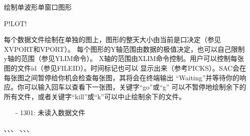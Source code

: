\label{cmd:plot}

绘制单波形单窗口图形

\begin{SACSTX}
P!LOT!
\end{SACSTX}

每个数据文件绘制在单独的图上，图形的整天大小由当前是口决定（参见XVPORT和VPORT）。
每个图形的Y轴范围由数据的极值决定，也可以自己限制y轴的范围（参见YLIM命令）。
X轴的范围由XLIM命令控制。用户可以控制每张图的文件id（参见FILEID）。时间标记也可以
显示出来（参考PICKS）。SAC会在每张图之间暂停给你机会检查每张图，其将会在终端输出
``Waiting''并等待你的响应。你可以输入回车以查看下一张图，关键字``go''或``g''
可以不暂停地绘制余下的所有文件，或者关键字``kill''或``k''可以中止绘制余下的文件。

\begin{itemize}
\item[-]1301: 未读入数据文件
\end{itemize}

、、、
、、、

